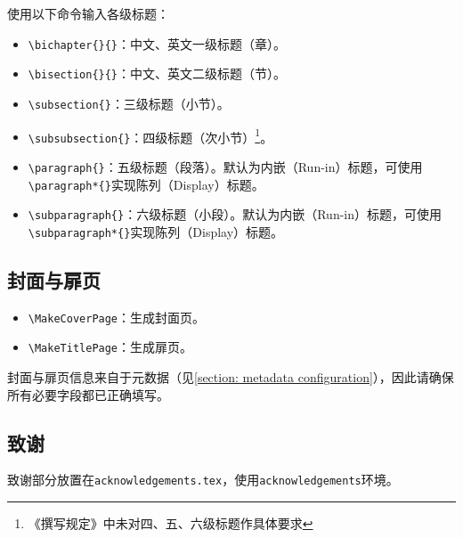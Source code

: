 使用以下命令输入各级标题：
\begin{itemize}[itemsep=2pt,topsep=5pt]
    \item \verb|\bichapter{}{}|：中文、英文一级标题（章）。
    \item \verb|\bisection{}{}|：中文、英文二级标题（节）。
    \item \verb|\subsection{}|：三级标题（小节）。
    \item \verb|\subsubsection{}|：四级标题（次小节）\footnote{《撰写规定》中未对四、五、六级标题作具体要求}。
    \item \verb|\paragraph{}|：五级标题（段落）。默认为内嵌（Run-in）标题，可使用\verb|\paragraph*{}|实现陈列（Display）标题。
    \item \verb|\subparagraph{}|：六级标题（小段）。默认为内嵌（Run-in）标题，可使用\verb|\subparagraph*{}|实现陈列（Display）标题。
\end{itemize}


\subsection{封面与扉页}
\begin{itemize}[itemsep=2pt,topsep=5pt]
    \item \verb|\MakeCoverPage|：生成封面页。
    \item \verb|\MakeTitlePage|：生成扉页。
\end{itemize}

封面与扉页信息来自于元数据（见\ref{section: metadata configuration}），因此请确保所有必要字段都已正确填写。

\subsection{致谢}
致谢部分放置在\texttt{acknowledgements.tex}，使用\texttt{acknowledgements}环境。

